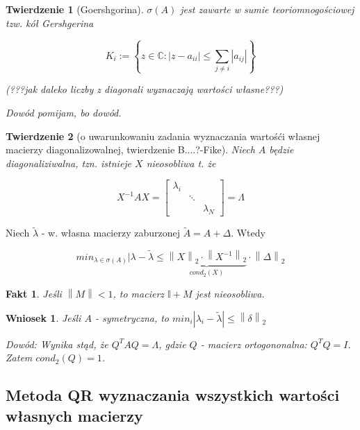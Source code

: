 \documentclass[hidelinks,a4paper,fleqn]{article}
\newcommand{\II}{\mathbb{I}}
\newcommand{\CC}{\mathbb{C}}
\newcommand{\norm}[1]{\left\lVert#1\right\rVert}
\newtheorem{wniosek}{Wniosek}
\newtheorem{fakt}{Fakt}
\newtheorem{twierdz}{Twierdzenie}
\begin{document}
\begin{twierdz}[Goershgorina] $\sigma(A)$ jest zawarte w sumie teoriomnogościowej tzw. kół Gershgerina
	
	\[
		K_{i} := \left\{ z \in \CC: |z - a_{ii} | \leq \sum_{j \neq i} |a_{ij}| \right\}
	\]
	
	(???jak daleko liczby z diagonali wyznaczają wartości własne???)
	
	
	Dowód pomijam, bo dowód.
	
\end{twierdz}

\begin{twierdz}[o uwarunkowaniu zadania wyznaczania wartośći własnej macierzy diagonalizowalnej, twierdzenie B....?-Fike]
	Niech $A$ będzie diagonaliziwalna, tzn. istnieje $X$ nieosobliwa t. że
	
	\[
		X^{-1}AX = \left[ \begin{array}{ccc} \lambda_i & & \\ & \ddots \\ & & \lambda_N \end{array} \right] = \Lambda
	\]
\end{twierdz}

Niech $\tilde{\lambda}$ - w. własna macierzy zaburzonej $\tilde{A} = A + \Delta$. Wtedy

\[
	min_{\lambda \in \sigma(A)} |\lambda - \tilde{\lambda} \leq \underbrace{\norm{X} _2 \cdot \norm{X^{-1}}_2}_{cond_2(X)} \cdot \norm{\Delta}_2
\]

\begin{fakt}Jeśli $\norm{M} < 1$, to macierz $\II+M$ jest nieosobliwa.
\end{fakt}

\begin{wniosek}
	Jeśli $A$ - symetryczna, to $min_i |\lambda_i - \tilde{\lambda}| \leq \norm{\delta}_2$
	
	Dowód: Wynika stąd, że $Q^TAQ = \Lambda$, gdzie $Q$ - macierz ortogononalna: $Q^TQ = I$. Zatem $cond_2(Q) = 1$.
\end{wniosek}

\subsection{Metoda QR wyznaczania wszystkich wartości własnych macierzy}
\end{document}
